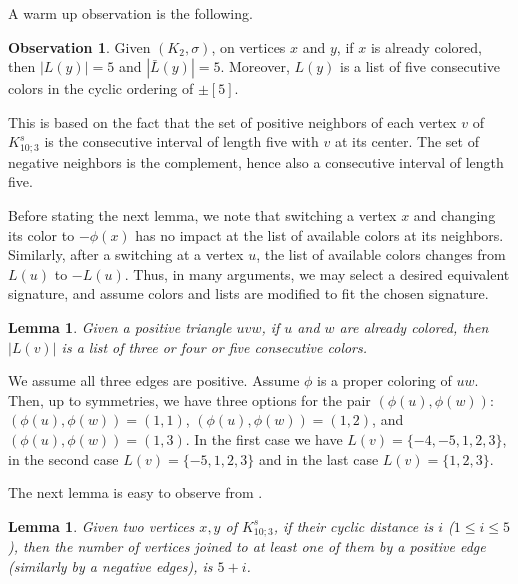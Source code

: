 \documentclass[11pt,a4paper]{article}
\makeatletter
\renewenvironment{proof}[1][\proofname]{\par
	\pushQED{\qed}%
	\normalfont \topsep6\p@\@plus6\p@\relax
	\trivlist
	\item[\hskip\labelsep
	\bfseries
	#1\@addpunct{.}]\ignorespaces
}{%
	\popQED\endtrivlist\@endpefalse
}
\newtheorem{lemma}[theorem]{Lemma}
\theoremstyle{definition}
\newtheorem{observation}[theorem]{Observation}
\makeatother
\begin{document}
	A warm up observation is the following.
	
	\begin{observation}\label{obs:counting_partial_coloring-K2}
		Given $(K_2, \sigma)$, on vertices $x$ and $y$, if $x$ is already colored, then $|L(y)|=5$ and $|\bar{L}(y)|=5$. Moreover, $L(y)$ is a list of five consecutive colors in the cyclic ordering of $\pm [5]$. 
	\end{observation}
	
	This is based on the fact that the set of positive neighbors of each vertex $v$ of $K_{10;3}^s$ is the consecutive interval of length five with $v$ at its center. The set of negative neighbors is the complement, hence also a consecutive interval of length five.
	
	
	Before stating the next lemma, we note that switching a vertex $x$ and changing its color to $-\phi(x)$ has no impact at the list of available colors at its neighbors. Similarly, after a switching at a vertex $u$, the list of available colors changes from $L(u)$ to $-L(u)$. Thus, in many arguments, we may select a desired equivalent signature, and assume colors and lists are modified to fit the chosen signature. 
	
	
	\begin{lemma}\label{lem:counting_partial_coloringK3}
		Given a positive triangle $uvw$, if $u$ and $w$ are already colored, then $|L(v)|$ is a list of  three or four or five consecutive colors.
	\end{lemma}
	
	
	\begin{proof}
		We assume all three edges are positive. Assume $\phi$ is a proper coloring of $uw$. Then, up to symmetries, we have three options for the pair $(\phi(u), \phi(w))$:
		$(\phi(u), \phi(w))=(1,1)$, $(\phi(u), \phi(w))=(1,2)$, and $(\phi(u), \phi(w))=(1,3)$. In the first case we have $L(v)=\{-4,-5,1,2,3\}$, in the second case $L(v)=\{-5,1,2,3\}$ and in the last case $L(v)=\{1,2,3\}$.
	\end{proof}
	
	The next lemma is easy to observe from .
	
	\begin{lemma}\label{lem:distance_i} Given two vertices $x, y$ of $K_{10;3}^s$, if their cyclic distance is $i$ ($1\leq i\leq 5$), then the number of vertices joined to at least one of them by a positive edge (similarly by a negative edges), is $5+i$. 
	\end{lemma}	
	
\end{document}
